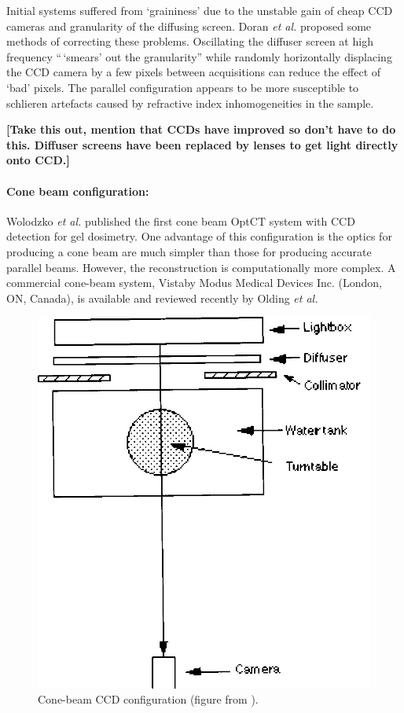 \documentclass[12pt]{article}
\begin{document}
Initial systems  suffered from `graininess' due to the unstable gain of cheap CCD cameras and granularity of the diffusing screen. \cite{Doran:2001ee}   Doran \textit{et al.} proposed some methods of correcting these problems. Oscillating the diffuser screen at high frequency 
``\,`smears' out the granularity'' while randomly horizontally displacing the CCD camera by a few pixels  between acquisitions can reduce the effect of `bad'  pixels.
 \cite{Doran:2001ee}
 The parallel configuration appears to be more susceptible to schlieren artefacts caused by refractive index inhomogeneities in the sample. \cite{Krstajic:2007hk}

\textbf{[Take this out, mention that CCDs have improved so don't have to do this. Diffuser screens have been replaced by lenses to get light directly onto CCD.]}




\paragraph{Cone beam configuration:}
Wolodzko \textit{et al.} published the first cone beam OptCT system with CCD detection for gel dosimetry.\cite{Wolodzko:1999} One advantage of this configuration is the optics for producing a cone beam are much simpler than those for producing accurate parallel beams. \cite{Doran:2008kh} However, the reconstruction is computationally more complex. \cite{hsieh2003computed} A commercial cone-beam system, Vista\texttrademark by Modus Medical Devices Inc. (London, ON, Canada),  is available and reviewed recently by Olding \textit{et al.} \cite{Olding:2011eta}


\begin{figure}[H]
\centering
\includegraphics[scale=0.3]{Wolodzko_1999_conesetup.jpg}
\caption{Cone-beam CCD configuration (figure from \cite{Wolodzko:1999}).}
\end{figure}
\end{document}
